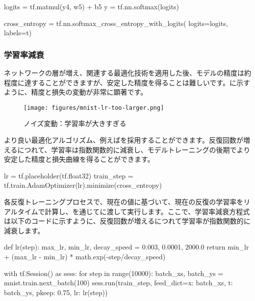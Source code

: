 \begin{content}
\begin{content}
\begin{leftbar}
\begin{python}
logits = tf.matmul(y4, w5) + b5
y = tf.nn.softmax(logits)

cross_entropy = tf.nn.softmax_cross_entropy_with_logits(
  logits=logits, labels=t)
\end{python}
\end{leftbar}

\subsubsection{学習率減衰}

ネットワークの層が増え、関連する最適化技術を適用した後、モデルの精度は約程度に達することができますが、安定した精度を得ることは難しいです。に示すように、精度と損失の変動が非常に顕著です。

\begin{figure}[H]
\centering
\texttt{[image: figures/mnist-lr-too-larger.png]}
\caption{ノイズ変動：学習率が大きすぎる}
 \label{fig:mnist-lr-too-larger}
\end{figure}

より良い最適化アルゴリズム、例えばを採用することができます。反復回数が増えるにつれて、学習率は指数関数的に減衰し、モデルトレーニングの後期でより安定した精度と損失曲線を得ることができます。

\begin{leftbar}
\begin{python}
lr = tf.placeholder(tf.float32)
train_step = tf.train.AdamOptimizer(lr).minimize(cross_entropy)
\end{python}
\end{leftbar}

各反復トレーニングプロセスで、現在の値に基づいて、現在の反復の学習率をリアルタイムで計算し、を通じてに渡して実行します。ここで、学習率減衰方程式は以下のコードに示すように、反復回数が増えるにつれて学習率が指数関数的に減衰します。

\begin{leftbar}
\begin{python}
def lr(step):
  max_lr, min_lr, decay_speed = 0.003, 0.0001, 2000.0
  return min_lr + (max_lr - min_lr) * math.exp(-step/decay_speed)

with tf.Session() as sess:
  for step in range(10000):
    batch_xs, batch_ys = mnist.train.next_batch(100)
    sess.run(train_step, 
      feed_dict={x: batch_xs, t: batch_ys, pkeep: 0.75, lr: lr(step)})
\end{python}
\end{leftbar}


\end{content}
\end{content}
